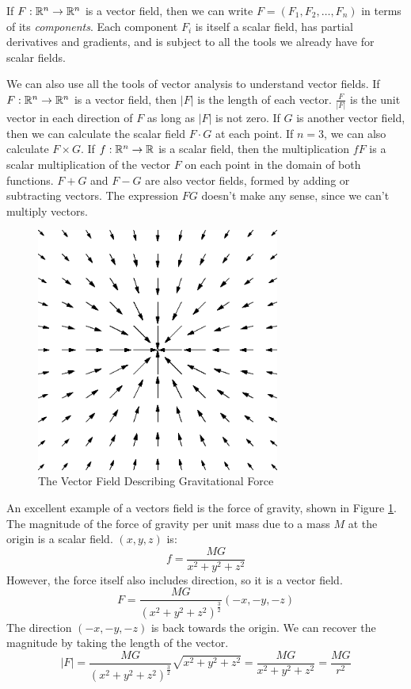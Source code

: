 \documentclass[fleqn,letterpaper]{report}
\begin{document}
\begin{defn}
If $F: \mathbb{R}^n \rightarrow \mathbb{R}^n$ is a vector field, then we can
write $F = (F_1, F_2, \ldots, F_n)$ in terms of its
\emph{components}. Each component $F_i$ is itself a scalar
field, has partial derivatives and gradients, and is
subject to all the tools we already have for scalar fields. 
\end{defn}

We can also use all the tools of vector analysis to understand
vector fields. If $F: \mathbb{R}^n \rightarrow \mathbb{R}^n$ is a vector
field, then $|F|$ is the length of each vector.
$\frac{F}{|F|}$ is the unit vector in each direction of $F$ as
long as $|F|$ is not zero. If $G$ is another vector field, then
we can calculate the scalar field $F \cdot G$ at each point. If
$n=3$, we can also calculate $F \times G$. If $f: \mathbb{R}^n
\rightarrow \mathbb{R}$ is a scalar field, then the multiplication
$fF$ is a scalar multiplication of the vector $F$ on each
point in the domain of both functions. $F + G$ and $F-G$ are
also vector fields, formed by adding or subtracting vectors.
The expression $FG$ doesn't make any sense, since we can't
multiply vectors. 

\begin{figure}[t]
\centering
\includegraphics[width=8cm]{figure07.eps}
\caption{The Vector Field Describing Gravitational Force}
\label{figure-vector-field2}
\end{figure} 

\begin{example}
An excellent example of a vectors field is the 
force of gravity, shown in Figure \ref{figure-vector-field2}.
The magnitude of the force of gravity per unit mass due to a
mass $M$ at the origin is a scalar field.
$(x,y,z)$ is:
\begin{equation*}
f = \frac{MG}{x^2+y^2+z^2}
\end{equation*}
However, the force itself also includes direction, so it is a
vector field.
\begin{equation*}
F = \frac{MG}{(x^2+y^2+z^2)^{\frac{3}{2}}} (-x,-y,-z)
\end{equation*}
The direction $(-x,-y,-z)$ is back towards the origin. 
We can recover the magnitude by taking the length of the
vector.
\begin{equation*}
|F| = \frac{MG}{(x^2 + y^2 + z^2)^\frac{3}{2}} \sqrt{x^2
+y^2+z^2} = \frac{MG}{x^2 +y^2+z^2} = \frac{MG}{r^2}
\end{equation*}
\end{example}
\end{document}
